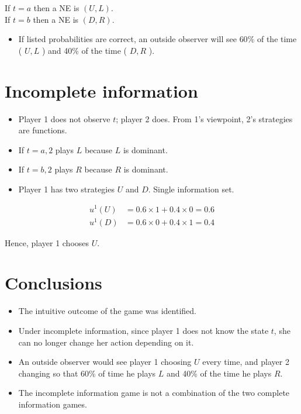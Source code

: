 \documentclass[10pt]{article}
\begin{document}
If $t=a$ then a NE is $(U, L)$.\\
If $t=b$ then a NE is $(D, R)$.

\begin{itemize}
  \item If listed probabilities are correct, an outside observer will see $60 \%$ of the time ( $U, L$ ) and 40\% of the time ( $D, R$ ).
\end{itemize}

\section*{Incomplete information}
\begin{itemize}
  \item Player 1 does not observe $t$; player 2 does. From 1's viewpoint, 2's strategies are functions.
  \item If $t=a, 2$ plays $L$ because $L$ is dominant.
  \item If $t=b, 2$ plays $R$ because $R$ is dominant.
  \item Player 1 has two strategies $U$ and $D$. Single information set.
\end{itemize}

$$
\begin{aligned}
u^{1}(U) & =0.6 \times 1+0.4 \times 0=0.6 \\
u^{1}(D) & =0.6 \times 0+0.4 \times 1=0.4
\end{aligned}
$$

Hence, player 1 chooses $U$.

\section*{Conclusions}
\begin{itemize}
  \item The intuitive outcome of the game was identified.
  \item Under incomplete information, since player 1 does not know the state $t$, she can no longer change her action depending on it.
  \item An outside observer would see player 1 choosing $U$ every time, and player 2 changing so that 60\% of time he plays $L$ and 40\% of the time he plays $R$.
  \item The incomplete information game is not a combination of the two complete information games.
\end{itemize}
\end{document}

